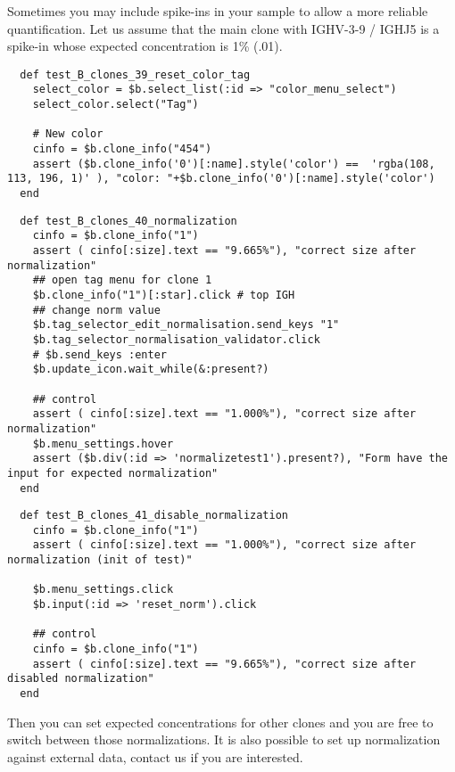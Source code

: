 Sometimes you may include spike-ins in your sample to allow a more reliable
quantification.
Let us assume that the main clone with IGHV-3-9 / IGHJ5 is a spike-in whose
expected concentration is 1\% (.01).

\begin{verbatim}
  def test_B_clones_39_reset_color_tag
    select_color = $b.select_list(:id => "color_menu_select")
    select_color.select("Tag")

    # New color
    cinfo = $b.clone_info("454")
    assert ($b.clone_info('0')[:name].style('color') ==  'rgba(108, 113, 196, 1)' ), "color: "+$b.clone_info('0')[:name].style('color')
  end
\end{verbatim}

\begin{verbatim}
  def test_B_clones_40_normalization
    cinfo = $b.clone_info("1")
    assert ( cinfo[:size].text == "9.665%"), "correct size after normalization"
    ## open tag menu for clone 1
    $b.clone_info("1")[:star].click # top IGH
    ## change norm value
    $b.tag_selector_edit_normalisation.send_keys "1"
    $b.tag_selector_normalisation_validator.click
    # $b.send_keys :enter
    $b.update_icon.wait_while(&:present?)

    ## control
    assert ( cinfo[:size].text == "1.000%"), "correct size after normalization"
    $b.menu_settings.hover
    assert ($b.div(:id => 'normalizetest1').present?), "Form have the input for expected normalization"
  end
\end{verbatim}

\begin{verbatim}
  def test_B_clones_41_disable_normalization
    cinfo = $b.clone_info("1")
    assert ( cinfo[:size].text == "1.000%"), "correct size after normalization (init of test)"
    
    $b.menu_settings.click
    $b.input(:id => 'reset_norm').click

    ## control
    cinfo = $b.clone_info("1")
    assert ( cinfo[:size].text == "9.665%"), "correct size after disabled normalization"
  end
\end{verbatim}

Then you can set expected concentrations for other clones and you are free to
switch between those normalizations.
It is also possible to set up normalization against external data,
contact us if you are interested.

